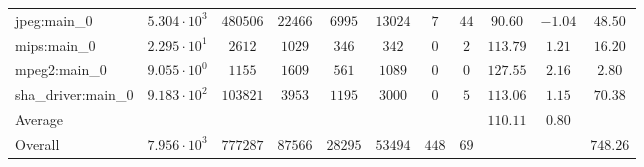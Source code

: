 \begin{tabular}{|l|c|c|c|c|c|c|c|c|c|c|}
jpeg:main\_0            & $ 5.304 \cdot 10^{3}  $ & $ 480506 $ & $ 22466 $ & $ 6995  $ & $ 13024 $ & $ 7   $ & $ 44 $ & $ 90.60       $ & $ -1.04   $ & $ 48.50   $ \\
mips:main\_0            & $ 2.295 \cdot 10^{1}  $ & $ 2612   $ & $ 1029  $ & $ 346   $ & $ 342   $ & $ 0   $ & $ 2  $ & $ 113.79      $ & $ 1.21    $ & $ 16.20   $ \\
mpeg2:main\_0           & $ 9.055 \cdot 10^{0}  $ & $ 1155   $ & $ 1609  $ & $ 561   $ & $ 1089  $ & $ 0   $ & $ 0  $ & $ 127.55      $ & $ 2.16    $ & $ 2.80    $ \\
sha\_driver:main\_0     & $ 9.183 \cdot 10^{2}  $ & $ 103821 $ & $ 3953  $ & $ 1195  $ & $ 3000  $ & $ 0   $ & $ 5  $ & $ 113.06      $ & $ 1.15    $ & $ 70.38   $ \\
\hline
Average                 & $                     $ & $        $ & $       $ & $       $ & $       $ & $     $ & $    $ & $ 110.11      $ & $ 0.80    $ & $         $ \\
\hline
Overall                 & $ 7.956 \cdot 10^{3}  $ & $ 777287 $ & $ 87566 $ & $ 28295 $ & $ 53494 $ & $ 448 $ & $ 69 $ & $             $ & $         $ & $ 748.26  $ \\
\hline
\end{tabular}
